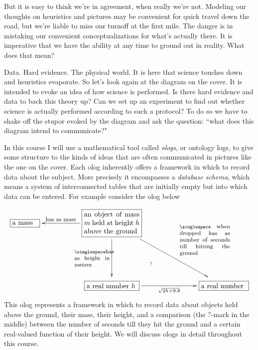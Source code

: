 \documentclass{book}
\def\tn{\textnormal}
\newcommand{\LA}[2]{\ar[#1]^-{\tn {#2}}}
\newcommand{\LAL}[2]{\ar[#1]_-{\tn {#2}}}
\newcommand{\obox}[3]{\stackrel{#1}{\fbox{\parbox{#2}{#3}}}}
\theoremstyle{remark}
\theoremstyle{definition}
\begin{document}
But it is easy to think we're in agreement, when really we're not. Modeling our thoughts on heuristics and pictures may be convenient for quick travel down the road, but we're liable to miss our turnoff at the first mile. The danger is in mistaking our convenient conceptualizations for what's actually there. It is imperative that we have the ability at any time to ground out in reality. What does that mean?

Data. Hard evidence. The physical world. It is here that science touches down and heuristics evaporate. So let's look again at the diagram on the cover. It is intended to evoke an idea of how science is performed. Is there hard evidence and data to back this theory up? Can we set up an experiment to find out whether science is actually performed according to such a protocol? To do so we have to shake off the stupor evoked by the diagram and ask the question: ``what does this diagram intend to communicate?"

In this course I will use a mathematical tool called {\em ologs}, or ontology logs, to give some structure to the kinds of ideas that are often communicated in pictures like the one on the cover. Each olog inherently offers a framework in which to record data about the subject. More precisely it encompasses a {\em database schema}, which means a system of interconnected tables that are initially empty but into which data can be entered. For example consider the olog below
$$\xymatrix{
\obox{}{.5in}{a mass}&&\obox{}{1.1in}{an object of mass $m$ held at height $h$ above the ground}\LAL{ll}{\footnotesize has as mass}\LA{rrdd}{\hspace{.4in}\parbox{1in}{\singlespace \footnotesize when dropped has as number of seconds till hitting the ground}}\LAL{dd}{\parbox{.7in}{\singlespace\footnotesize has as height in meters}}&&\\\\
&&\obox{}{1in}{a real number $h$}\ar@{}[uurr]|(.35){?}\ar[rr]_-{\sqrt{2h\div 9.8}}&\hspace{.3in}&\obox{}{.9in}{a real number}
}
$$
This olog represents a framework in which to record data about objects held above the ground, their mass, their height, and a comparison (the ?-mark in the middle) between the number of seconds till they hit the ground and a certain real-valued function of their height. We will discuss ologs in detail throughout this course. 
\end{document}
